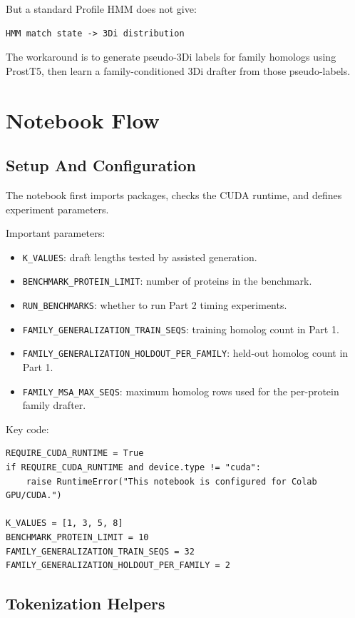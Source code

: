 \documentclass[11pt,a4paper]{article}
\begin{document}
But a standard Profile HMM does not give:

\begin{verbatim}
HMM match state -> 3Di distribution
\end{verbatim}

The workaround is to generate pseudo-3Di labels for family homologs using ProstT5, then learn a family-conditioned 3Di drafter from those pseudo-labels.

\section{Notebook Flow}

\subsection{Setup And Configuration}

The notebook first imports packages, checks the CUDA runtime, and defines experiment parameters.

Important parameters:

\begin{itemize}
  \item \texttt{K\_VALUES}: draft lengths tested by assisted generation.
  \item \texttt{BENCHMARK\_PROTEIN\_LIMIT}: number of proteins in the benchmark.
  \item \texttt{RUN\_BENCHMARKS}: whether to run Part 2 timing experiments.
  \item \texttt{FAMILY\_GENERALIZATION\_TRAIN\_SEQS}: training homolog count in Part 1.
  \item \texttt{FAMILY\_GENERALIZATION\_HOLDOUT\_PER\_FAMILY}: held-out homolog count in Part 1.
  \item \texttt{FAMILY\_MSA\_MAX\_SEQS}: maximum homolog rows used for the per-protein family drafter.
\end{itemize}

Key code:

\begin{verbatim}
REQUIRE_CUDA_RUNTIME = True
if REQUIRE_CUDA_RUNTIME and device.type != "cuda":
    raise RuntimeError("This notebook is configured for Colab GPU/CUDA.")

K_VALUES = [1, 3, 5, 8]
BENCHMARK_PROTEIN_LIMIT = 10
FAMILY_GENERALIZATION_TRAIN_SEQS = 32
FAMILY_GENERALIZATION_HOLDOUT_PER_FAMILY = 2
\end{verbatim}

\subsection{Tokenization Helpers}
\end{document}
